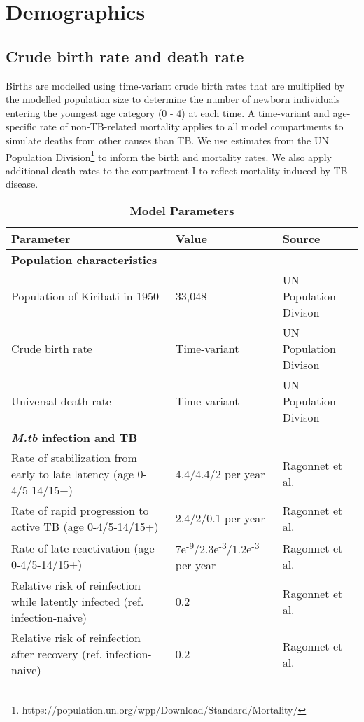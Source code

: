 

\section{Demographics}
\subsection{Crude birth rate and death rate}
Births are modelled using time-variant crude birth rates that are multiplied by the modelled population 
size to determine the number of newborn individuals entering the youngest age category (0 - 4) at each time. A time-variant 
and age-specific rate of non-TB-related mortality applies to all model compartments to simulate 
deaths from other causes than TB. We use estimates from the UN Population Division\footnote{https://population.un.org/wpp/Download/Standard/Mortality/} to inform the 
birth and mortality rates.
We also apply additional death rates to the compartment I to reflect mortality induced by TB 
disease.
\begin{table}[!htp]
    \caption{\textbf{Model Parameters}}
    \label{tab:parameter}
    \begin{threeparttable}
    \begin{tabularx}{\textwidth}{ X  X  X }
        \hline
        \textbf{Parameter} & \textbf{Value} & \textbf{Source} \\
        \hline
        \textbf{Population characteristics} & & \\
        Population of Kiribati in 1950 & 33,048 & UN Population Divison \\
        Crude birth rate  & Time-variant & UN Population Divison \\
        Universal death rate & Time-variant & UN Population Divison \\
        \hline
        \textbf{\emph{M.tb} infection and TB} \\
        Rate of stabilization from early to late latency (age 0-4/5-14/15+) & 4.4/4.4/2 per year & Ragonnet et al.\cite{ragonnet-2022} \\
        Rate of rapid progression to active TB (age 0-4/5-14/15+) & 2.4/2/0.1 per year & Ragonnet et al.\cite{ragonnet-2022} \\
        Rate of late reactivation (age 0-4/5-14/15+) & 7e\textsuperscript{-9}/2.3e\textsuperscript{-3}/1.2e\textsuperscript{-3} per year & Ragonnet et al.\cite{ragonnet-2022} \\
        Relative risk of reinfection while latently infected (ref. infection-naive) & 0.2 & Ragonnet et al.\cite{ragonnet-2022} \\
        Relative risk of reinfection after recovery (ref. infection-naive) & 0.2 & Ragonnet et al.\cite{ragonnet-2022} \\
        \hline
	\end{tabularx}
    \end{threeparttable}
\end{table}
